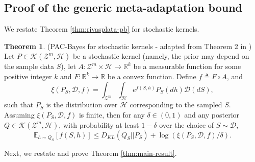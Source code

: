 \documentclass{article} %
\theoremstyle{definition}
\newtheorem{theorem}{Theorem}[section]
\newcommand{\Expect}[2]{\mathbb{E}_{#1}\left [#2 \right ]}
\begin{document}
\subsection{Proof of the generic meta-adaptation bound} \label{append:proof-main-result}

We restate Theorem \ref{thm:rivasplata-pb} for stochastic kernels. 

\begin{theorem} (PAC-Bayes for stochastic kernels - adapted from Theorem 2 in \citet{Rivasplata2020}) \label{thm:rivasplata-pb-appendix}
	Let $P\in \mathcal{K}(\mathcal{Z}^m, \mathcal{H})$ be a stochastic kernel (namely, the prior may depend on the sample data $S$), let $A: \mathcal{Z}^m\times \mathcal{H}\rightarrow \mathbb{R}^k$ be a measurable function for some positive integer $k$ and $F:\mathbb{R}^k\rightarrow \mathbb{R}$ be a convex function.
	Define $f\triangleq F\circ A$, and  
	$$
	\xi(P_S, \mathcal{D}, f)=\int_{\mathcal{Z}^m}\int_{\mathcal{H}}e^{f(S, h)}P_S(dh)\mathcal{D}(dS) , 
	$$
	such that $P_S$ is the distribution over $\mathcal{H}$ corresponding to the sampled $S$. Assuming $\xi(P_S, \mathcal{D}, f)$ is finite, then for any $\delta \in (0,1)$ and any posterior $Q\in \mathcal{K}(\mathcal{Z}^m, \mathcal{H})$, with probability at least $1-\delta$ over the choice of $S\sim \mathcal{D}$,
	\begin{equation} \label{eq:ribasplata-pb-appendix}
	\Expect{h\sim Q_S}{f(S, h)} \leq D_{KL}(Q_S||P_S)+\log\left (\xi(P_S, \mathcal{D}, f)/\delta\right ) .
	\end{equation}
\end{theorem}
%
Next, we restate and prove Theorem \ref{thm:main-result}. 
\end{document}
